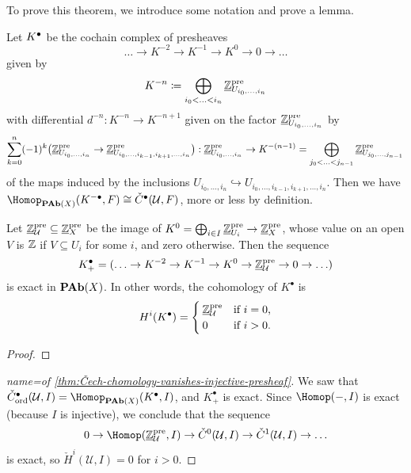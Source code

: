 To prove this theorem, we introduce some notation and prove a lemma.

\begin{notn}
Let \({K}^\bullet\) be the cochain complex of presheaves
\[ \ldots \to K^{-2}\to K^{-1} \to K^0\to 0\to \ldots \]
given by
\[ K^{-n}\coloneq\bigoplus_{i_0<\ldots<i_n}\underline{\mathbb{Z}}^{\smash{\textup{pre}}}_{U_{i_0,\ldots,i_n}} \]
with differential \(d^{-n}\colon K^{-n}\to K^{-n+1}\) given on the factor \(\underline{\mathbb{Z}}^{\smash{\textup{pre}}}_{U_{i_0,\ldots,i_n}}\) by
\begin{align*}
  \sum_{k=0}^n(-1)^k\bigl(\underline{\bb Z}^{\smash{\textup{pre}}}_{U_{i_0,\ldots,i_n}}\to\underline{\bb Z}^{\smash{\textup{pre}}}_{U_{i_0,\ldots,i_{k-1},i_{k+1},\ldots,i_n}}\bigr) \colon \underline{\bb Z}^{\smash{\textup{pre}}}_{U_{i_0,\ldots,i_n}} \to K^{-(n-1)}=\bigoplus_{j_0<\ldots<j_{n-1}}\underline{\bb Z}^{\smash{\textup{pre}}}_{U_{j_0,\ldots,j_{n-1}}}
\end{align*}
of the maps induced by the inclusions \(U_{i_0,\ldots,i_n}\hookrightarrow U_{i_0,\ldots,i_{k-1},i_{k+1},\ldots,i_n}\).
Then we have \(\Hom[\catAbelianPresheaf(X)](K^{-\bullet}, F) \cong \check{C}^\bullet(\mathcal U,F)\), more or less by definition.
\end{notn}

\begin{lem}
Let \(\underline{\mathbb{Z}}^{\smash{\textup{pre}}}_{\mathcal U}\subseteq\underline{\mathbb{Z}}^{\smash{\textup{pre}}}_X\) be the image of \(K^0=\bigoplus_{i\in I}\underline{\mathbb{Z}}^{\smash{\textup{pre}}}_{U_i}\to\underline{\mathbb{Z}}^{\smash{\textup{pre}}}_X\), whose value on an open \(V\) is \(\mathbb{Z}\) if \(V\subseteq U_i\) for some \(i\), and zero otherwise.
Then the sequence
\[ K^\bullet_+ = (\ldots\to K^{-2}\to K^{-1}\to K^0\to\underline{\mathbb{Z}}^{\smash{\textup{pre}}}_{\mathcal U}\to 0\to\ldots) \]
is exact in \(\operatorname{\mathbf{PAb}}(X)\).
In other words, the cohomology of \(K^\bullet\) is
\[ H^i(K^\bullet) =
  \begin{cases}
    \underline{\mathbb{Z}}^{\smash{\textup{pre}}}_{\mathcal U} & \text{if } i = 0\text{,} \\
    0 & \text{if } i > 0\text{.}
  \end{cases}
\]
\end{lem}
\begin{proof}
\end{proof}

\begin{proof}[name={of \cref{thm:Čech-chomology-vanishes-injective-presheaf}}]
We saw that \(\check{C}^\bullet_{\smash{\textup{ord}}}(\mathcal U,I) = \Hom[\catAbelianPresheaf(X)](K^\bullet,I)\), and \(K^\bullet_+\) is exact.
Since \(\Hom(-,I)\) is exact (because \(I\) is injective), we conclude that the sequence
\[ 0\to \Hom(\underline{\bb Z}^{\smash{\textup{pre}}}_{\mathcal U},I) \to \check{C}^0(\mathcal U,I) \to \check{C}^1(\mathcal U,I)\to\ldots \]
is exact, so \(\check{H}^i(\mathcal U,I)=0\) for \(i>0\).
\end{proof}

